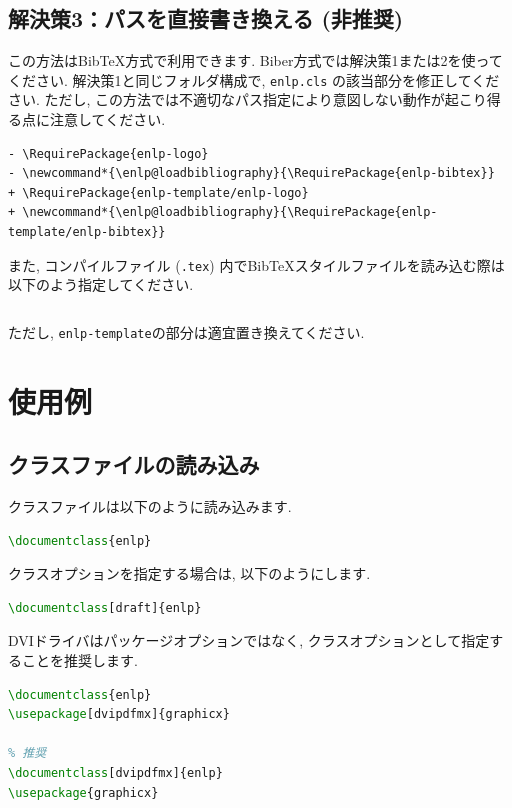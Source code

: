 \documentclass{ltjsarticle}
\begin{document}
\subsection{解決策3：パスを直接書き換える (非推奨)}
この方法はBibTeX方式で利用できます. Biber方式では解決策1または2を使ってください. 
解決策1と同じフォルダ構成で, \texttt{enlp.cls} の該当部分を修正してください. 
ただし, この方法では不適切なパス指定により意図しない動作が起こり得る点に注意してください. 
\par\noindent\begin{minipage}{\linewidth}
\begin{lstlisting}[style=diff]
- \RequirePackage{enlp-logo}
- \newcommand*{\enlp@loadbibliography}{\RequirePackage{enlp-bibtex}}
+ \RequirePackage{enlp-template/enlp-logo}
+ \newcommand*{\enlp@loadbibliography}{\RequirePackage{enlp-template/enlp-bibtex}}
\end{lstlisting}
\end{minipage}\par
また, コンパイルファイル (\texttt{.tex}) 内でBibTeXスタイルファイルを読み込む際は以下のよう指定してください. 
\begin{lstlisting}[language=TeX]

\end{lstlisting}
ただし, \texttt{enlp-template}の部分は適宜置き換えてください.
\section{使用例}
\subsection{クラスファイルの読み込み}
クラスファイルは以下のように読み込みます.
\begin{lstlisting}[language=TeX]
\documentclass{enlp}
\end{lstlisting}
クラスオプションを指定する場合は, 以下のようにします.
\begin{lstlisting}[language=TeX]
\documentclass[draft]{enlp}
\end{lstlisting}
\begin{warning}
DVIドライバはパッケージオプションではなく, クラスオプションとして指定することを推奨します.
\begin{lstlisting}[language=TeX,xleftmargin=1.5em]
% 非推奨
\documentclass{enlp}
\usepackage[dvipdfmx]{graphicx}

% 推奨
\documentclass[dvipdfmx]{enlp}
\usepackage{graphicx}
\end{lstlisting}
\end{warning}
\end{document}
